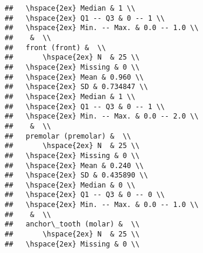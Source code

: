 \documentclass{article}\usepackage[]{graphicx}\usepackage[]{color}
\makeatletter
\newenvironment{kframe}{%
 \def\at@end@of@kframe{}%
 \ifinner\ifhmode%
  \def\at@end@of@kframe{\end{minipage}}%
  \begin{minipage}{\columnwidth}%
 \fi\fi%
 \def\FrameCommand##1{\hskip\@totalleftmargin \hskip-\fboxsep
 \colorbox{shadecolor}{##1}\hskip-\fboxsep
     \hskip-\linewidth \hskip-\@totalleftmargin \hskip\columnwidth}%
 \MakeFramed {\advance\hsize-\width
   \@totalleftmargin\z@ \linewidth\hsize
   \@setminipage}}%
 {\par\unskip\endMakeFramed%
 \at@end@of@kframe}
\newenvironment{knitrout}{}{} %
\makeatother
\begin{document}
\begin{knitrout}
\begin{kframe}
\begin{verbatim}
##   \hspace{2ex} Median & 1 \\ 
##   \hspace{2ex} Q1 -- Q3 & 0 -- 1 \\ 
##   \hspace{2ex} Min. -- Max. & 0.0 -- 1.0 \\ 
##    &  \\ 
##   front (front) &  \\ 
##       \hspace{2ex} N  & 25 \\ 
##   \hspace{2ex} Missing & 0 \\ 
##   \hspace{2ex} Mean & 0.960 \\ 
##   \hspace{2ex} SD & 0.734847 \\ 
##   \hspace{2ex} Median & 1 \\ 
##   \hspace{2ex} Q1 -- Q3 & 0 -- 1 \\ 
##   \hspace{2ex} Min. -- Max. & 0.0 -- 2.0 \\ 
##    &  \\ 
##   premolar (premolar) &  \\ 
##       \hspace{2ex} N  & 25 \\ 
##   \hspace{2ex} Missing & 0 \\ 
##   \hspace{2ex} Mean & 0.240 \\ 
##   \hspace{2ex} SD & 0.435890 \\ 
##   \hspace{2ex} Median & 0 \\ 
##   \hspace{2ex} Q1 -- Q3 & 0 -- 0 \\ 
##   \hspace{2ex} Min. -- Max. & 0.0 -- 1.0 \\ 
##    &  \\ 
##   anchor\_tooth (molar) &  \\ 
##       \hspace{2ex} N  & 25 \\ 
##   \hspace{2ex} Missing & 0 \\ 

\end{verbatim}
\end{kframe}
\end{knitrout}
\end{document}
